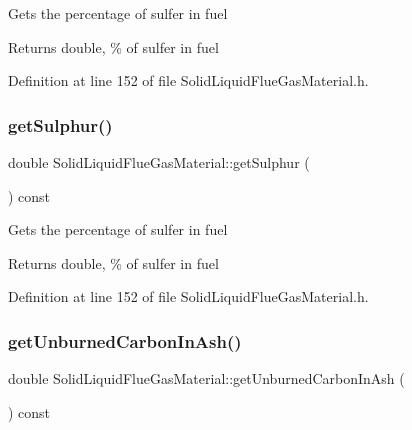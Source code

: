 Gets the percentage of sulfer in fuel \begin{DoxyReturn}{Returns}
double, \% of sulfer in fuel 
\end{DoxyReturn}


Definition at line 152 of file Solid\+Liquid\+Flue\+Gas\+Material.\+h.

\mbox{\label{class_solid_liquid_flue_gas_material_abe35d8ff283bfa5aadcf00f9906025ae}} 
\subsubsection{\texorpdfstring{get\+Sulphur()}{getSulphur()}\hspace{0.1cm}{\footnotesize\ttfamily [3/3]}}
{\footnotesize\ttfamily double Solid\+Liquid\+Flue\+Gas\+Material\+::get\+Sulphur (\begin{DoxyParamCaption}{ }\end{DoxyParamCaption}) const\hspace{0.3cm}{\ttfamily [inline]}}

Gets the percentage of sulfer in fuel \begin{DoxyReturn}{Returns}
double, \% of sulfer in fuel 
\end{DoxyReturn}


Definition at line 152 of file Solid\+Liquid\+Flue\+Gas\+Material.\+h.

\mbox{\label{class_solid_liquid_flue_gas_material_a53ac34a949168a35297ab3afb9eb2c7b}} 
\subsubsection{\texorpdfstring{get\+Unburned\+Carbon\+In\+Ash()}{getUnburnedCarbonInAsh()}\hspace{0.1cm}{\footnotesize\ttfamily [1/3]}}
{\footnotesize\ttfamily double Solid\+Liquid\+Flue\+Gas\+Material\+::get\+Unburned\+Carbon\+In\+Ash (\begin{DoxyParamCaption}{ }\end{DoxyParamCaption}) const\hspace{0.3cm}{\ttfamily [inline]}}

